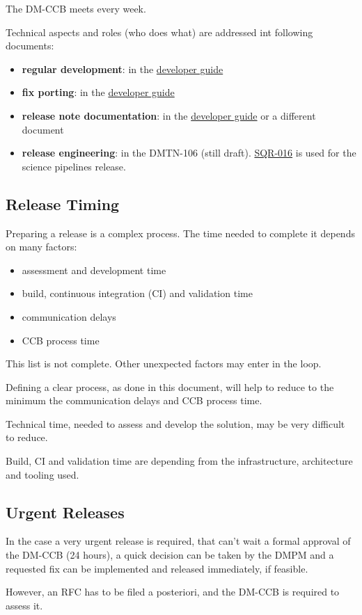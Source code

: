 The DM-CCB meets every week.

Technical aspects and roles (who does what) are addressed int following documents:

\begin{itemize}
\item {\bf regular development}: in the \href{https://developer.lsst.io/}{developer guide}
\item {\bf fix porting}: in the \href{https://developer.lsst.io/}{developer guide}
\item {\bf release note documentation}: in the \href{https://developer.lsst.io/}{developer guide} or a different document
\item {\bf release engineering}: in the DMTN-106 (still draft). \href{https://sqr-016.lsst.io/}{SQR-016} is used for the science pipelines release.
\end{itemize}


\subsection{Release Timing}

Preparing a release is a complex process.
The time needed to complete it depends on many factors:

\begin{itemize}
\item assessment and development time
\item build, continuous integration (CI) and validation time
\item communication delays
\item CCB process time
\end{itemize}

This list is not complete. Other unexpected factors may enter in the loop.

Defining a clear process, as done in this document, will help to reduce to the minimum the communication delays and CCB process time.

Technical time, needed to assess and develop the solution, may be very difficult to reduce.

Build, CI and validation time are depending from the infrastructure, architecture and tooling used.


\subsection{Urgent Releases}

In the case a very urgent release is required, that can't wait a formal approval of the DM-CCB (24 hours),
a quick decision can be taken by the DMPM and a requested fix can be implemented and released immediately, if feasible.

However, an RFC has to be filed a posteriori, and the DM-CCB is required to assess it.

